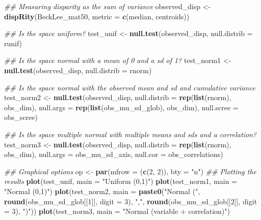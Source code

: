 \documentclass[]{book}
\newenvironment{Shaded}{\begin{snugshade}}{\end{snugshade}}
\newcommand{\CommentTok}[1]{\textcolor[rgb]{0.56,0.35,0.01}{\textit{#1}}}
\newcommand{\DataTypeTok}[1]{\textcolor[rgb]{0.13,0.29,0.53}{#1}}
\newcommand{\DecValTok}[1]{\textcolor[rgb]{0.00,0.00,0.81}{#1}}
\newcommand{\KeywordTok}[1]{\textcolor[rgb]{0.13,0.29,0.53}{\textbf{#1}}}
\newcommand{\NormalTok}[1]{#1}
\newcommand{\StringTok}[1]{\textcolor[rgb]{0.31,0.60,0.02}{#1}}
\begin{document}
\begin{Shaded}
\begin{Highlighting}[]
\CommentTok{## Measuring disparity as the sum of variance}
\NormalTok{observed_disp <-}\StringTok{ }\KeywordTok{dispRity}\NormalTok{(BeckLee_mat50, }\DataTypeTok{metric =} \KeywordTok{c}\NormalTok{(median, centroids))}

\CommentTok{## Is the space uniform?}
\NormalTok{test_unif <-}\StringTok{ }\KeywordTok{null.test}\NormalTok{(observed_disp, }\DataTypeTok{null.distrib =}\NormalTok{ runif)}

\CommentTok{## Is the space normal with a mean of 0 and a sd of 1?}
\NormalTok{test_norm1 <-}\StringTok{ }\KeywordTok{null.test}\NormalTok{(observed_disp, }\DataTypeTok{null.distrib =}\NormalTok{ rnorm)}

\CommentTok{## Is the space normal with the observed mean and sd and cumulative variance}
\NormalTok{test_norm2 <-}\StringTok{ }\KeywordTok{null.test}\NormalTok{(observed_disp, }\DataTypeTok{null.distrib =} \KeywordTok{rep}\NormalTok{(}\KeywordTok{list}\NormalTok{(rnorm), obs_dim),}
                        \DataTypeTok{null.args =} \KeywordTok{rep}\NormalTok{(}\KeywordTok{list}\NormalTok{(obs_mu_sd_glob), obs_dim),}
                        \DataTypeTok{null.scree =}\NormalTok{ obs_scree)}

\CommentTok{## Is the space multiple normal with multiple means and sds and a correlation?}
\NormalTok{test_norm3 <-}\StringTok{ }\KeywordTok{null.test}\NormalTok{(observed_disp, }\DataTypeTok{null.distrib =} \KeywordTok{rep}\NormalTok{(}\KeywordTok{list}\NormalTok{(rnorm), obs_dim),}
                        \DataTypeTok{null.args =}\NormalTok{ obs_mu_sd_axis, }\DataTypeTok{null.cor =}\NormalTok{ obs_correlations)}

\CommentTok{## Graphical options}
\NormalTok{op <-}\StringTok{ }\KeywordTok{par}\NormalTok{(}\DataTypeTok{mfrow =}\NormalTok{ (}\KeywordTok{c}\NormalTok{(}\DecValTok{2}\NormalTok{, }\DecValTok{2}\NormalTok{)), }\DataTypeTok{bty =} \StringTok{"n"}\NormalTok{)}
\CommentTok{## Plotting the results}
\KeywordTok{plot}\NormalTok{(test_unif, }\DataTypeTok{main =} \StringTok{"Uniform (0,1)"}\NormalTok{)}
\KeywordTok{plot}\NormalTok{(test_norm1, }\DataTypeTok{main =} \StringTok{"Normal (0,1)"}\NormalTok{)}
\KeywordTok{plot}\NormalTok{(test_norm2, }\DataTypeTok{main =} \KeywordTok{paste0}\NormalTok{(}\StringTok{"Normal ("}\NormalTok{, }\KeywordTok{round}\NormalTok{(obs_mu_sd_glob[[}\DecValTok{1}\NormalTok{]], }\DataTypeTok{digit =} \DecValTok{3}\NormalTok{),}
                              \StringTok{","}\NormalTok{, }\KeywordTok{round}\NormalTok{(obs_mu_sd_glob[[}\DecValTok{2}\NormalTok{]], }\DataTypeTok{digit =} \DecValTok{3}\NormalTok{), }\StringTok{")"}\NormalTok{))}
\KeywordTok{plot}\NormalTok{(test_norm3, }\DataTypeTok{main =} \StringTok{"Normal (variable + correlation)"}\NormalTok{)}
\end{Highlighting}
\end{Shaded}
\end{document}
